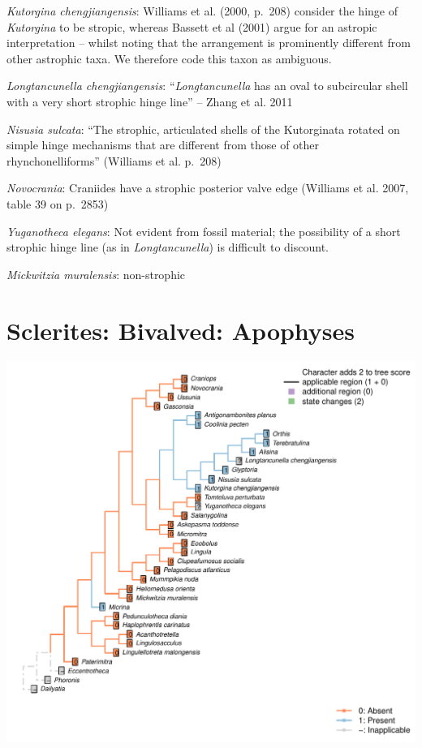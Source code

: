 \documentclass[]{book}
\theoremstyle{definition}
\theoremstyle{definition}
\theoremstyle{definition}
\theoremstyle{remark}
\begin{document}
\emph{Kutorgina chengjiangensis}: Williams et al. (2000, p.~208)
consider the hinge of \emph{Kutorgina} to be stropic, whereas Bassett et
al (2001) argue for an astropic interpretation -- whilst noting that the
arrangement is prominently different from other astrophic taxa. We
therefore code this taxon as ambiguous.

\emph{Longtancunella chengjiangensis}: ``\emph{Longtancunella} has an
oval to subcircular shell with a very short strophic hinge line'' --
Zhang et al. 2011

\emph{Nisusia sulcata}: ``The strophic, articulated shells of the
Kutorginata rotated on simple hinge mechanisms that are different from
those of other rhynchonelliforms'' (Williams et al. p.~208)

\emph{Novocrania}: Craniides have a strophic posterior valve edge
(Williams et al. 2007, table 39 on p.~2853)

\emph{Yuganotheca elegans}: Not evident from fossil material; the
possibility of a short strophic hinge line (as in \emph{Longtancunella})
is difficult to discount.

\emph{Mickwitzia muralensis}: non-strophic

\hypertarget{sclerites-bivalved-apophyses}{%
\section*{Sclerites: Bivalved:
Apophyses}\label{sclerites-bivalved-apophyses}}

\includegraphics{Brachiopod_phylogeny_files/figure-latex/unnamed-chunk-5-4.pdf}
\end{document}
